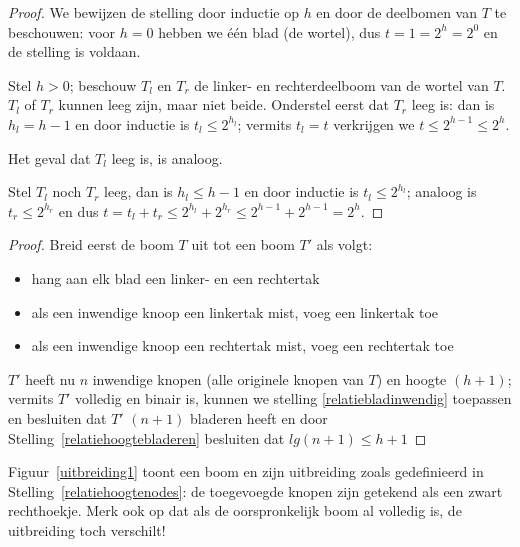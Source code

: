 \begin{proof}
We bewijzen de stelling door inductie op $h$ en door de deelbomen van $T$
te beschouwen: voor $h=0$ hebben we \'{e}\'{e}n blad (de wortel), dus
$t=1=2^h=2^0$ en de stelling is voldaan.

Stel $h > 0$; beschouw $T_{l}$ en $T_{r}$ de linker- en
rechterdeelboom van de wortel van $T$. $T_{l}$ of $T_{r}$ kunnen leeg zijn,
maar niet beide. Onderstel eerst dat $T_{r}$ leeg is: dan is
$h_{l} = h-1$ en door inductie is $t_{l} \leq 2^{h_{l}}$; vermits 
$t_{l} = t$ verkrijgen we $t \leq 2^{h-1}\leq 2^h$. 

Het geval dat $T_{l}$ leeg is, is analoog.

Stel $T_{l}$ noch $T_{r}$ leeg, dan is $h_{l} \leq h-1$ en door
inductie is $t_{l} \leq 2^{h_{l}}$; analoog is $t_{r} \leq 2^{h_{r}}$ en dus
$t=t_{l} + t_{r} \leq 2^{h_{l}} + 2^{h_{r}}\leq 2^{h-1}+2^{h-1}=2^h$.
\end{proof}

\begin{proof}
Breid eerst de boom $T$ uit tot een boom $T'$ als volgt:
\begin{itemize}
\item
hang aan elk blad een linker- en een rechtertak
\item
als een 
inwendige
knoop een linkertak mist, voeg een linkertak toe
\item
als een 
inwendige
knoop een rechtertak mist, voeg een rechtertak toe
\end{itemize}

$T'$ heeft nu $n$ inwendige knopen (alle originele knopen van $T$) en hoogte
$(h+1)$; vermits $T'$ volledig en binair is, kunnen we stelling
\ref{relatiebladinwendig} toepassen en besluiten dat $T'$ $(n+1)$ bladeren
heeft en door Stelling~\ref{relatiehoogtebladeren} besluiten dat $lg(n+1)
\leq h+1$
\end{proof}

Figuur~\ref{uitbreiding1} toont een boom en zijn uitbreiding zoals
gedefinieerd in Stelling~\ref{relatiehoogtenodes}: de toegevoegde knopen
zijn getekend als een zwart rechthoekje. Merk ook op dat als de
oorspronkelijk boom al volledig is, de uitbreiding toch verschilt!

